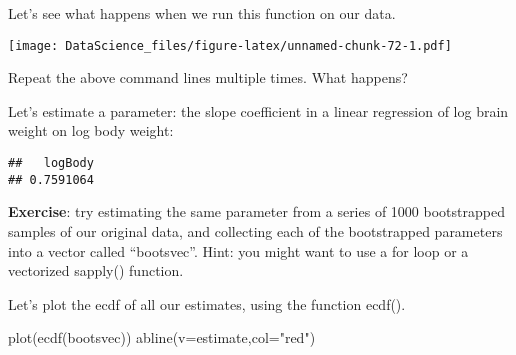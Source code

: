 \documentclass[
]{book}
\newenvironment{Shaded}{\begin{snugshade}}{\end{snugshade}}
\newcommand{\AttributeTok}[1]{\textcolor[rgb]{0.77,0.63,0.00}{#1}}
\newcommand{\DecValTok}[1]{\textcolor[rgb]{0.00,0.00,0.81}{#1}}
\newcommand{\FunctionTok}[1]{\textcolor[rgb]{0.00,0.00,0.00}{#1}}
\newcommand{\NormalTok}[1]{#1}
\newcommand{\OtherTok}[1]{\textcolor[rgb]{0.56,0.35,0.01}{#1}}
\newcommand{\SpecialCharTok}[1]{\textcolor[rgb]{0.00,0.00,0.00}{#1}}
\newcommand{\StringTok}[1]{\textcolor[rgb]{0.31,0.60,0.02}{#1}}
\begin{document}
Let's see what happens when we run this function on our data.

\begin{Shaded}
\end{Shaded}

\texttt{[image: DataScience\_files/figure-latex/unnamed-chunk-72-1.pdf]}

Repeat the above command lines multiple times. What happens?

Let's estimate a parameter: the slope coefficient in a linear regression of log brain weight on log body weight:

\begin{Shaded}
\end{Shaded}

\begin{verbatim}
##   logBody 
## 0.7591064
\end{verbatim}

\textbf{Exercise}: try estimating the same parameter from a series of 1000 bootstrapped samples of our original data, and collecting each of the bootstrapped parameters into a vector called ``bootsvec''. Hint: you might want to use a for loop or a vectorized sapply() function.

Let's plot the ecdf of all our estimates, using the function ecdf().

\begin{Shaded}
\begin{Highlighting}[]
\FunctionTok{plot}\NormalTok{(}\FunctionTok{ecdf}\NormalTok{(bootsvec))}
\FunctionTok{abline}\NormalTok{(}\AttributeTok{v=}\NormalTok{estimate,}\AttributeTok{col=}\StringTok{"red"}\NormalTok{)}
\end{Highlighting}
\end{Shaded}
\end{document}
